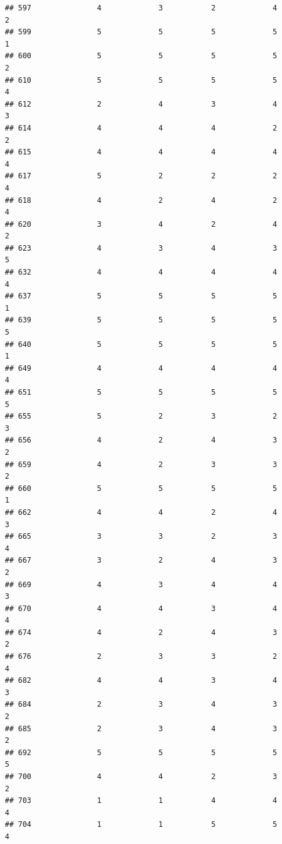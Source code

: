 \documentclass[
]{article}
\begin{document}
\begin{verbatim}
## 597               4             3           2             4            2
## 599               5             5           5             5            1
## 600               5             5           5             5            2
## 610               5             5           5             5            4
## 612               2             4           3             4            3
## 614               4             4           4             2            2
## 615               4             4           4             4            4
## 617               5             2           2             2            4
## 618               4             2           4             2            4
## 620               3             4           2             4            2
## 623               4             3           4             3            5
## 632               4             4           4             4            4
## 637               5             5           5             5            1
## 639               5             5           5             5            5
## 640               5             5           5             5            1
## 649               4             4           4             4            4
## 651               5             5           5             5            5
## 655               5             2           3             2            3
## 656               4             2           4             3            2
## 659               4             2           3             3            2
## 660               5             5           5             5            1
## 662               4             4           2             4            3
## 665               3             3           2             3            4
## 667               3             2           4             3            2
## 669               4             3           4             4            3
## 670               4             4           3             4            4
## 674               4             2           4             3            2
## 676               2             3           3             2            4
## 682               4             4           3             4            3
## 684               2             3           4             3            2
## 685               2             3           4             3            2
## 692               5             5           5             5            5
## 700               4             4           2             3            2
## 703               1             1           4             4            4
## 704               1             1           5             5            4

\end{verbatim}
\end{document}
